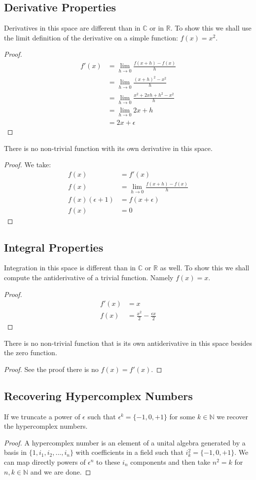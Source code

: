 \documentclass[10pt, oneside]{article}
\newcommand{\R}{\mathbb{R}}
\newcommand{\C}{\mathbb{C}}
\newcommand{\N}{\mathbb{N}}
\begin{document}
\subsection*{Derivative Properties}
Derivatives in this space are different than in $\C$ or in $\R$. To show this we shall use the limit definition of the derivative on a simple function: $f(x) = x^2$.
\begin{proof}
\begin{align*}
   f'(x) &= \lim_{h \to 0} \frac{f(x+h)-f(x)}{h} \\
   &= \lim_{h \to 0} \frac{(x+h)^2 - x^2}{h} \\
   &= \lim_{h \to 0} \frac{x^2 + 2xh + h^2 - x^2}{h} \\
   &= \lim_{h \to 0} 2x + h \\
   &= 2x + \epsilon
\end{align*}
\end{proof}
There is no non-trivial function with its own derivative in this space.
\begin{proof}
   We take:
\begin{align*}
   f(x) &= f'(x) \\
   f(x) &= \lim_{h \to 0} \frac{f(x+h)-f(x)}{h} \\
   f(x)(\epsilon + 1) &= f(x+\epsilon)\\
   f(x) &= 0
\end{align*}
\end{proof}
\subsection*{Integral Properties}
Integration in this space is different than in $\C$ or $\R$ as well. To show this we shall compute the antiderivative of a trivial function. Namely $f(x) = x$.
\begin{proof}
\begin{align*}
   f'(x) &= x \\
   f(x) &= \frac{x^2}{2} - \frac{\epsilon x}{2}
\end{align*}
\end{proof}
There is no non-trivial function that is its own antiderivative in this space besides the zero function.
\begin{proof}
   See the proof there is no $f(x) = f'(x)$.
\end{proof}
\subsection*{Recovering Hypercomplex Numbers}
If we truncate a power of $\epsilon$ such that $\epsilon^k = \{-1,0,+1\}$ for some $k \in \N$ we recover the hypercomplex numbers.
\begin{proof}
   A hypercomplex number is an element of a unital algebra generated by a basis in $\{1, i_1, i_2, ..., i_n\}$ with coefficients in a field \cite{Taber1904} such that $i^2_k = \{-1,0,+1 \}$.
   We can map directly powers of $\epsilon^n$ to these $i_n$ components and then take $n^2 = k$ for $n,k \in \N$ and we are done.
\end{proof}
\end{document}
